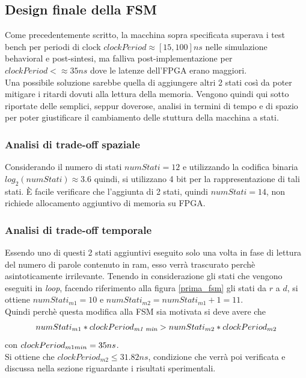 \documentclass[11pt,a4paper]{article}
\begin{document}
        \subsection{Design finale della FSM}
            Come precedentemente scritto, la macchina sopra specificata superava i test bench per periodi di clock $clockPeriod \approx [15,100] ns$ nelle simulazione behavioral e post-sintesi, ma falliva post-implementazione per $clockPeriod <\approx 35 ns$ dove le latenze dell'FPGA erano maggiori.\\
            Una possibile soluzione sarebbe quella di aggiungere altri 2 stati così da poter mitigare i ritardi dovuti alla lettura della memoria. Vengono quindi qui sotto riportate delle semplici, seppur doverose, analisi in termini di tempo e di spazio per poter giustificare il cambiamento delle stuttura della macchina a stati.
            \subsubsection{Analisi di trade-off spaziale}
                Considerando il numero di stati $numStati = 12$ e utilizzando la codifica binaria $log_2(numStati) \approx 3.6$ quindi, si utilizzano 4 bit per la rappresentazione di tali stati. È facile verificare che l'aggiunta di 2 stati, quindi $numStati = 14$, non richiede allocamento aggiuntivo di memoria su FPGA.
            \subsubsection{Analisi di trade-off temporale} \label{cap:tradeoff_temporale}
                Essendo uno di questi 2 stati aggiuntivi eseguito solo una volta in fase di lettura del numero di parole contenuto in ram, esso verrà trascurato perchè asintoticamente irrilevante. Tenendo in considerazione gli stati che vengono eseguiti in \textit{loop}, facendo riferimento alla figura \ref{prima_fsm} gli stati da $r$ a $d$, si ottiene $numStati_{m1} = 10$ e $numStati_{m2} =numStati_{m1} + 1= 11$.\\
                Quindi perchè questa modifica alla FSM sia motivata si deve avere che 
                \begin{gather*}
                    numStati_{m1} * clockPeriod_{\textit{\text{m1 min}}} > numStati_{m2} * clockPeriod_{m2} 
                \end{gather*}
                con $clockPeriod_{m1 \space min} = 35 ns$.\\
                Si ottiene che $clockPeriod_{m2} \leq 31.82 ns$, condizione che verrà poi verificata e discussa nella sezione riguardante i risultati sperimentali.
\end{document}
